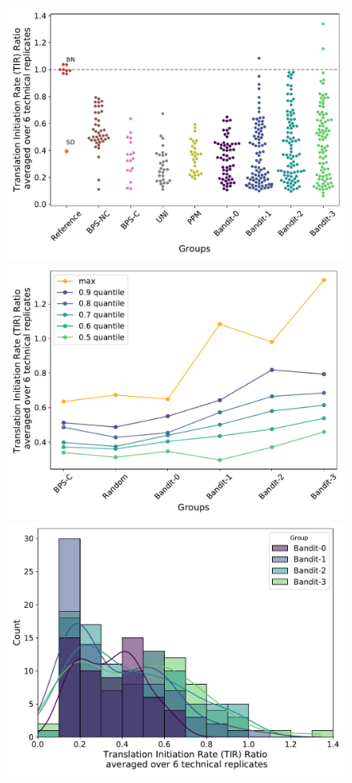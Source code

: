 \documentclass{article}
\begin{document}
\begin{figure}[!ht]
    \centering
    \includegraphics[scale=0.4]{plots/Main_Paper/swarmplot.pdf}
    \includegraphics[scale=0.4]{plots/Main_Paper/quantplot.pdf}
    \includegraphics[scale=0.4]{plots/Main_Paper/histogram.pdf}

\end{figure}
\end{document}
